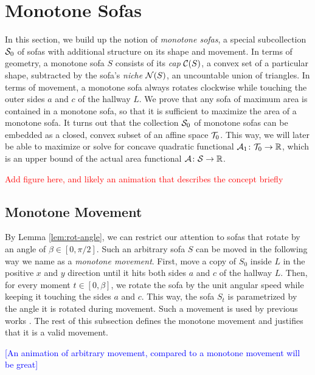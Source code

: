\section{Monotone Sofas}

In this section, we build up the notion of \emph{monotone sofas}, a special subcollection $\mathcal{S}_0$ of sofas with additional structure on its shape and movement.
In terms of geometry, a monotone sofa $S$ consists of its \emph{cap} $\mathcal{C}(S)$, a convex set of a particular shape, subtracted by the sofa's \emph{niche} $\mathcal{N}(S)$, an uncountable union of triangles.
In terms of movement, a monotone sofa always rotates clockwise while touching the outer sides $a$ and $c$ of the hallway $L$.
We prove that any sofa of maximum area is contained in a monotone sofa, so that it is sufficient to maximize the area of a monotone sofa. 
It turns out that the collection $\mathcal{S}_0$ of monotone sofas can be embedded as a closed, convex subset of an affine space $\mathcal{T}_0$.
This way, we will later be able to maximize or solve for concave quadratic functional $\mathcal{A}_1 \colon \mathcal{T}_0 \rightarrow \mathbb{R}$, which is an upper bound of the actual area functional $\mathcal{A} \colon \mathcal{S} \rightarrow \mathbb{R}$.

\textcolor{red}{Add figure here, and likely an animation that describes the concept briefly}

\subsection{Monotone Movement}
By Lemma \ref{lem:rot-angle}, we can restrict our attention to sofas that rotate by an angle of $\beta \in [0, \pi / 2]$.
Such an arbitrary sofa $S$ can be moved in the following way we name as a \emph{monotone movement}.
First, move a copy of $S_0$ inside $L$ in the positive $x$ and $y$ direction until it hits both sides $a$ and $c$ of the hallway $L$.
Then, for every moment $t \in [0, \beta]$, we rotate the sofa by the unit angular speed while keeping it touching the sides $a$ and $c$.
This way, the sofa $S_t$ is parametrized by the angle it is rotated during movement.
Such a movement is used by previous works \cite{gerver1992moving, romik2018differential, kallus2018improved}.
The rest of this subsection defines the monotone movement and justifies that it is a valid movement.

\textcolor{blue}{[An animation of arbitrary movement, compared to a monotone movement will be great]}

